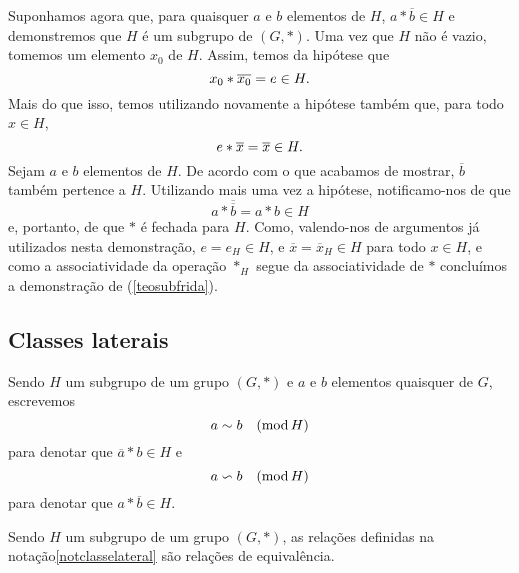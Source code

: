 \begin{dem}
  Suponhamos agora que, para quaisquer $a$ e $b$ elementos de $H$,
  $a\ast \overline{b}\in H$ e demonstremos que $H$ é um subgrupo de
  $(G,\ast )$. Uma vez que
  $H$ não é vazio, tomemos um elemento $x_0$ de
  $H$. Assim, temos da hipótese que
  \begin{equation*}
    x_0\ast \overline{x_0}=e\in H\mathrm{.}
  \end{equation*} Mais
  do que isso,
  temos utilizando novamente a hipótese também que, para todo $x\in
  H$,
  \begin{equation*}
    e\ast \overline{x} = \overline{x}\in H\mathrm{.}
  \end{equation*}
  Sejam $a$ e $b$ elementos de $H$. De acordo com o que
  acabamos de mostrar, $\overline{b}$ também pertence a $H$. Utilizando
  mais uma vez a hipótese, notificamo-nos de que
  \begin{equation*}
    a\ast \overline{\overline{b}} = a\ast b\in H
  \end{equation*}
  e, portanto, de que $\ast$ é fechada para $H$. Como, valendo-nos de
  argumentos já utilizados nesta demonstração,
  $e=e_H\in H$, e
  $\overline{x}=\overline{x}_H\in H$ para todo $x\in H$, e como a
  associatividade da operação $\ast_H$ segue da associatividade de
  $\ast$
  concluímos a demonstração de (\ref{teosubfrida}).
\end{dem}

\subsection{Classes laterais}

\begin{Not}\label{notclasselateral}
  Sendo $H$ um subgrupo de um grupo
  $(G,\ast)$ e $a$ e $b$ elementos quaisquer de
  $G$, escrevemos
  \begin{equation*}
    \simb[relação de congruência à direita entre $a$ e $b$ módulo
    $H$]{\congmodright{a}{b}{H}}
  \end{equation*}
  para denotar que $\overline{a}\ast b\in H$ e
  \begin{equation*}
    \simb[relação de congruência à esquerda entre $a$ e $b$ módulo
    $H$]{\congmodleft{a}{b}{H}}
  \end{equation*}
  para denotar que $a\ast \overline{b}\in H$.
\end{Not}

\begin{Teo}
  Sendo $H$ um subgrupo de um grupo
  $(G,\ast)$, as relações definidas na
  notação\xspace\ref{notclasselateral} são relações de equivalência.
\end{Teo}

